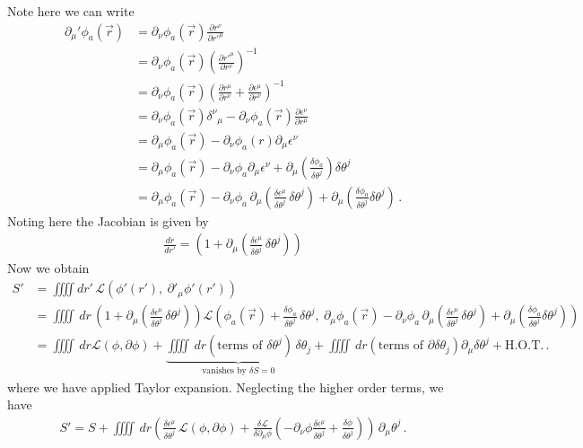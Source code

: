 \documentclass[11pt, onesided]{book}
\theoremstyle{break}
\theoremstyle{break}
\newcommand{\pd}{\partial}
\begin{document}
Note here we can write
\begin{align*}
\pd_\mu'\phi_a(\vec{r}) &= \pd_\nu \phi_a(\vec{r}) \frac{\pd r^\nu}{\pd r'^\mu} \\
&= \pd_\nu \phi_a(\vec{r}) \left(\frac{\pd r'^\mu}{\pd r^\nu} \right)^{-1}\\
&= \pd_\nu \phi_a(\vec{r})\left( \frac{\pd r^\mu}{\pd r^\nu} + \frac{\pd \epsilon^\mu}{\pd r^\nu} \right)^{-1}\\
&= \pd_\nu \phi_a(\vec{r}) \delta^\nu{}_{\mu} - \pd_\nu \phi_a(\vec{r}) \frac{\pd \epsilon^\nu}{\pd r^\mu}\\
&= \pd_\mu \phi_a(\vec{r}) - \pd_\nu \phi_a(r) \pd_\mu \epsilon^\nu\\
&= \pd_\mu \phi_a(\vec{r}) - \pd_\nu \phi_a\pd_\mu \epsilon^\nu + \pd_\mu \left( \frac{\delta \phi_a}{\delta \theta^j}\right) \delta \theta^j\\
&= \pd_\mu \phi_a(\vec{r}) - \pd_\nu \phi_a\,\pd_\mu\left( \frac{\delta \epsilon^\mu}{\delta \theta^j}\, \delta \theta^j\right)  + \pd_\mu \left( \frac{\delta \phi_a}{\delta \theta^j} \delta \theta^j\right)\,.
\end{align*}
Noting here the Jacobian is given by
\begin{align*}
\frac{dr}{dr'} = \left(1+ \pd_\mu \left( \frac{\delta \epsilon^\mu}{\delta \theta^j}\, \delta \theta^j\right)\right)
\end{align*}
Now we obtain
\begin{align*}
S' 
&= \iiiint dr' \, \mathcal{L}\left(\phi'(r'),\ \pd'_\mu \phi'(r')\right)\\
&=\iiiint \, dr \, \left(1+ \pd_\mu \left( \frac{\delta \epsilon^\mu}{\delta \theta^j}\, \delta \theta^j\right)\right)\mathcal{L}\left(
\phi_a(\vec{r}) + \frac{\delta \phi_a}{\delta \theta^j}\, \delta \theta^j
,\ 
\pd_\mu \phi_a(\vec{r}) - \pd_\nu \phi_a\,\pd_\mu\left( \frac{\delta \epsilon^\mu}{\delta \theta^j}\, \delta \theta^j\right)  + \pd_\mu \left( \frac{\delta \phi_a}{\delta \theta^j} \delta \theta^j\right)
\right)\\
&= \iiiint \, dr \mathcal{L}(\phi, \pd\phi) + \underbrace{\iiiint \, dr\left(\text{terms of $\delta\theta^j$} \right)\, \delta \theta_j}_{\text{vanishes by $\delta S = 0$}} + \iiiint \, dr\left(\text{terms of $\pd \delta\theta_j$}\right) \pd_\mu \delta \theta^j + \text{H.O.T.}\,.
\end{align*}
where we have applied Taylor expansion. Neglecting the higher order terms, we have
\begin{align*}
S' = S+ \iiiint \, dr\left( \frac{\delta \epsilon^\mu}{\delta \theta^j}\,\mathcal{L}(\phi, \pd \phi) + \frac{\delta \mathcal{L}}{\delta \pd_\mu \phi}\left(-\pd_\nu \phi \frac{\delta \epsilon^\mu}{\delta \theta^j} + \frac{\delta \phi}{\delta \theta^j}\right)\right) \, \pd_\mu \theta^j\,. 
\end{align*} 
\end{document}
